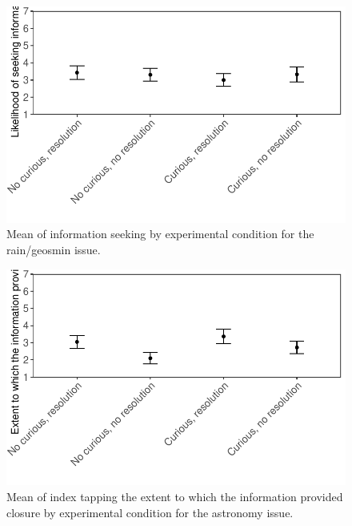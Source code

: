 \documentclass[
  letterpaper,
  DIV=11,
  numbers=noendperiod]{scrartcl}
\begin{document}
\begin{figure}

{\centering \includegraphics{curiosity_student-pilot_data-analysis_files/figure-pdf/fig-rinfoseek-1.pdf}

}

\caption{\label{fig-rinfoseek}Mean of information seeking by
experimental condition for the rain/geosmin issue.}

\end{figure}

\begin{figure}

{\centering \includegraphics{curiosity_student-pilot_data-analysis_files/figure-pdf/fig-aclosure-1.pdf}

}

\caption{\label{fig-aclosure}Mean of index tapping the extent to which
the information provided closure by experimental condition for the
astronomy issue.}

\end{figure}
\end{document}
